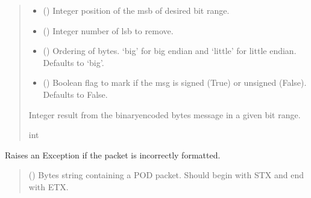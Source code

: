 \documentclass[letterpaper,10pt,english]{sphinxmanual}
\begin{document}
\begin{fulllineitems}
\begin{fulllineitems}
\begin{quote}
\begin{description}
\begin{itemize}
\item {} 
\sphinxAtStartPar
{} () \textendash{} Integer position of the msb of desired bit range.

\item {} 
\sphinxAtStartPar
{} () \textendash{} Integer number of lsb to remove.

\item {} 
\sphinxAtStartPar
{} (\sphinxstyleliteralemphasis{\sphinxupquote{, }}) \textendash{} Ordering of bytes. ‘big’ for big endian and ‘little’ for little                 endian. Defaults to ‘big’.

\item {} 
\sphinxAtStartPar
{} (\sphinxstyleliteralemphasis{\sphinxupquote{, }}) \textendash{} Boolean flag to mark if the msg is signed (True) or unsigned (False).                 Defaults to False.

\end{itemize}

\sphinxAtStartPar
Integer result from the binary\sphinxhyphen{}encoded bytes message in a given bit range.

\sphinxAtStartPar
int

\end{description}\end{quote}

\end{fulllineitems}


\begin{fulllineitems}
\label{\detokenize{Morelia.Packets:Morelia.Packets.Packet.Packet.CheckIfPacketIsValid}}
\pysigstartsignatures
{}
\pysigstopsignatures
\sphinxAtStartPar
Raises an Exception if the packet is incorrectly formatted.
\begin{quote}\begin{description}
\sphinxAtStartPar
{} () \textendash{} Bytes string containing a POD packet. Should begin with STX                 and end with ETX.


\end{description}
\end{quote}
\end{fulllineitems}
\end{fulllineitems}
\end{document}

